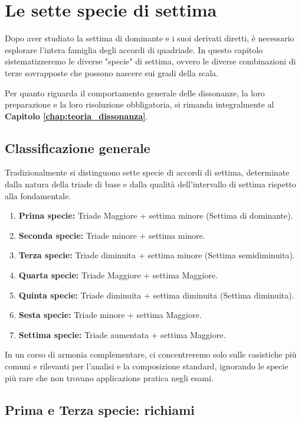 \chapter{Le sette specie di settima}
\label{chap:sette_specie}

Dopo aver studiato la settima di dominante e i suoi derivati diretti, è necessario esplorare l'intera famiglia degli accordi di quadriade. In questo capitolo sistematizzeremo le diverse "specie" di settima, ovvero le diverse combinazioni di terze sovrapposte che possono nascere sui gradi della scala.

Per quanto riguarda il comportamento generale delle dissonanze, la loro preparazione e la loro risoluzione obbligatoria, si rimanda integralmente al \textbf{Capitolo \ref{chap:teoria_dissonanza}}.

\section{Classificazione generale}
\label{sec:classificazione_specie}

Tradizionalmente si distinguono sette specie di accordi di settima, determinate dalla natura della triade di base e dalla qualità dell'intervallo di settima rispetto alla fondamentale.

\begin{enumerate}
    \item \textbf{Prima specie:} Triade Maggiore + settima minore (Settima di dominante).
    \item \textbf{Seconda specie:} Triade minore + settima minore.
    \item \textbf{Terza specie:} Triade diminuita + settima minore (Settima semidiminuita).
    \item \textbf{Quarta specie:} Triade Maggiore + settima Maggiore.
    \item \textbf{Quinta specie:} Triade diminuita + settima diminuita (Settima diminuita).
    \item \textbf{Sesta specie:} Triade minore + settima Maggiore.
    \item \textbf{Settima specie:} Triade aumentata + settima Maggiore.
\end{enumerate}

In un corso di armonia complementare, ci concentreremo solo sulle casistiche più comuni e rilevanti per l'analisi e la composizione standard, ignorando le specie più rare che non trovano applicazione pratica negli esami.

\section{Prima e Terza specie: richiami}
\label{sec:richiami_specie}

